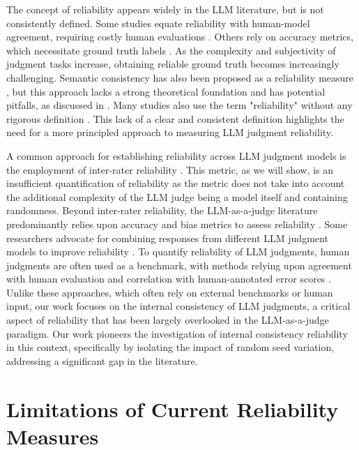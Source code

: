 \documentclass[11pt]{article}
\begin{document}
The concept of reliability appears widely in the LLM literature, but is not consistently defined. Some studies equate reliability with human-model agreement, requiring costly human evaluations \citep{sun2024parrot, zhang2024can}. Others rely on accuracy metrics, which necessitate ground truth labels \citep{zheng2024response, macherla2023mddial, wei2024systematic}. As the complexity and subjectivity of judgment tasks increase, obtaining reliable ground truth becomes increasingly challenging. Semantic consistency has also been proposed as a reliability measure \citep{govil2024cobias, raj2023semantic}, but this approach lacks a strong theoretical foundation and has potential pitfalls, as discussed in \citet{schroeder2024reliability}. Many studies also use the term "reliability" without any rigorous definition \citep{tan2024peer, liao2023automatic, gupta2024llm}. This lack of a clear and consistent definition highlights the need for a more principled approach to measuring LLM judgment reliability.


A common approach for establishing reliability across LLM judgment models is the employment of inter-rater reliability \citep{kollitsch2024does, wang2024prompt}. This metric, as we will show, is an insufficient quantification of reliability as the metric does not take into account the additional complexity of the LLM judge being a model itself and containing randomness. Beyond inter-rater reliability, the LLM-as-a-judge literature predominantly relies upon accuracy and bias metrics to assess reliability \citep{chen2024humans, wei2024systematic, ye2024justice}. Some researchers advocate for combining responses from different LLM judgment models to improve reliability \citep{gu2024survey, patel2024aime}. To quantify reliability of LLM judgments, human judgments are often used as a benchmark, with methods relying upon agreement with human evaluation and correlation with human-annotated error scores \citep{jung2024trust, fu-etal-2023-large, dong2024can}. Unlike these approaches, which often rely on external benchmarks or human input, our work focuses on the internal consistency of LLM judgments, a critical aspect of reliability that has been largely overlooked in the LLM-as-a-judge paradigm. Our work pioneers the investigation of internal consistency reliability in this context, specifically by isolating the impact of random seed variation, addressing a significant gap in the literature.

\section{Limitations of Current Reliability Measures}
\end{document}
